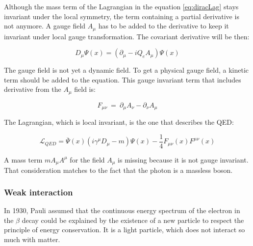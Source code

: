       Although the mass term of the Lagrangian in the equation \ref{eq:diracLag} stays invariant under the local symmetry, the term containing a partial derivative is not anymore.
      A gauge field $A_{\mu}$ has to be added to the derivative to keep it invariant under local gauge transformation.
      The covariant derivative will be then: 

      \begin{equation}
        D_{\mu} \Psi\left(x\right) =  \left(\partial_{\mu} - i Q_e A_{\mu}\right) \Psi\left(x\right)
      \end{equation}

     The gauge field is not yet a dynamic field. To get a physical gauge field, a kinetic term should be added to the equation.
     This gauge invariant term that includes derivative from the $A_{\mu}$ field is:
    
     \begin{equation}
       F_{\mu \nu} \ = \ \partial_\mu A_\nu - \partial_\nu A_\mu
     \end{equation}

     The Lagrangian, which is local invariant, is the one that describes the QED:

    \begin{equation}
        \mathcal{L}_{QED} =  \overline{\Psi}\left(x\right)\left( i \gamma^\mu D_\mu - m \right) \Psi\left(x\right) - \frac{1}{4}F_{\mu \nu}\left(x\right) F^{\mu \nu}\left(x\right)
    \end{equation}

    A mass term $m A_{\mu} A^{\mu}$ for the field $A_{\mu}$ is missing because it is not gauge invariant. 
    That consideration matches to the fact that the photon is a massless boson.


    \subsubsection{Weak interaction}

    In 1930, Pauli assumed that the continuous energy spectrum of the electron in the $\beta$ decay could be explained by the existence of a new particle to respect the principle of energy conservation. 
    It is a light particle, which does not interact so much with matter.


